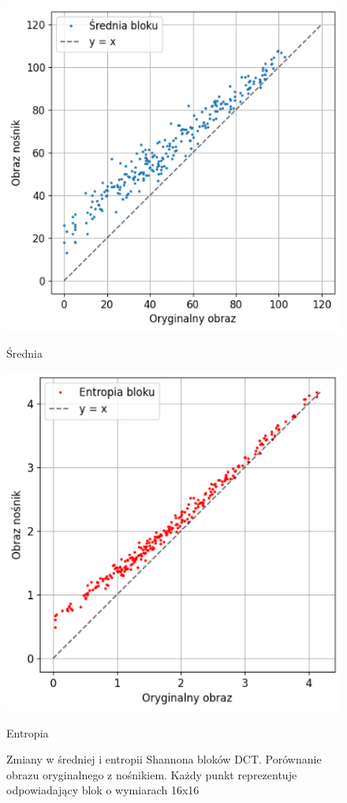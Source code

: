         \begin{figure}[h]
            \centering
            \begin{minipage}{0.45\textwidth}
                \centering
                \includegraphics[width=\textwidth]{img/mean_dct.png}
                \caption{Średnia}
            \end{minipage}
            \hfill
            \begin{minipage}{0.45\textwidth}
                \centering
                \includegraphics[width=\textwidth]{img/ent_dct.png}
                \caption{Entropia}
            \end{minipage}
            \caption{Zmiany w średniej i entropii Shannona bloków DCT. Porównanie obrazu oryginalnego z nośnikiem. Każdy punkt reprezentuje odpowiadający blok o wymiarach 16x16}
            \label{compare_mean_ent}
        \end{figure}   
